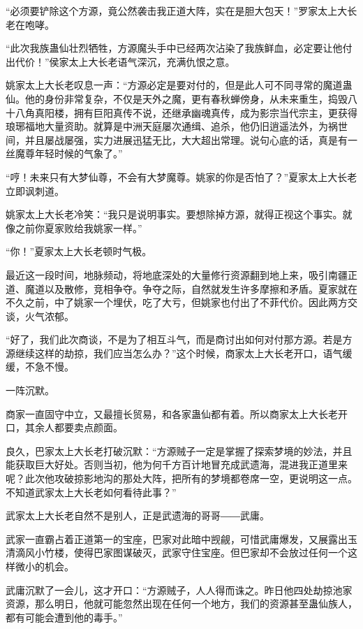 
\begin{this_body}

“必须要铲除这个方源，竟公然袭击我正道大阵，实在是胆大包天！”罗家太上大长老在咆哮。

“此次我族蛊仙壮烈牺牲，方源魔头手中已经两次沾染了我族鲜血，必定要让他付出代价！”侯家太上大长老语气深沉，充满仇恨之意。

姚家太上大长老叹息一声：“方源必定是要对付的，但是此人可不同寻常的魔道蛊仙。他的身份非常复杂，不仅是天外之魔，更有春秋蝉傍身，从未来重生，捣毁八十八角真阳楼，拥有巨阳真传不说，还继承幽魂真传，成为影宗当代宗主，更获得琅琊福地大量资助。就算是中洲天庭屡次通缉、追杀，他仍旧逍遥法外，为祸世间，并且屡战屡强，实力进展迅猛无比，大大超出常理。说句心底的话，真是有一丝魔尊年轻时候的气象了。”

“哼！未来只有大梦仙尊，不会有大梦魔尊。姚家的你是否怕了？”夏家太上大长老立即讽刺道。

姚家太上大长老冷笑：“我只是说明事实。要想除掉方源，就得正视这个事实。就像之前你夏家败给我姚家一样。”

“你！”夏家太上大长老顿时气极。

最近这一段时间，地脉频动，将地底深处的大量修行资源翻到地上来，吸引南疆正道、魔道以及散修，竞相争夺。争夺之际，自然就发生许多摩擦和矛盾。夏家就在不久之前，中了姚家一个埋伏，吃了大亏，但姚家也付出了不菲代价。因此两方交谈，火气浓郁。

“好了，我们此次商谈，不是为了相互斗气，而是商讨出如何对付那方源。若是方源继续这样的劫掠，我们应当怎么办？”这个时候，商家太上大长老开口，语气缓缓，不急不慢。

一阵沉默。

商家一直固守中立，又最擅长贸易，和各家蛊仙都有着。所以商家太上大长老开口，其余人都要卖点颜面。

良久，巴家太上大长老打破沉默：“方源贼子一定是掌握了探索梦境的妙法，并且能获取巨大好处。否则当初，他为何千方百计地冒充成武遗海，混进我正道里来呢？此次他攻破掠影地沟的那处大阵，把所有的梦境都卷席一空，更说明这一点。不知道武家太上大长老如何看待此事？”

武家太上大长老自然不是别人，正是武遗海的哥哥――武庸。

武家一直霸占着正道第一的宝座，巴家对此暗中觊觎，可惜武庸爆发，又展露出玉清滴风小竹楼，使得巴家图谋破灭，武家守住宝座。但巴家却不会放过任何一个这样微小的机会。

武庸沉默了一会儿，这才开口：“方源贼子，人人得而诛之。昨日他四处劫掠池家资源，那么明日，他就可能忽然出现在任何一个地方，我们的资源甚至蛊仙族人，都有可能会遭到他的毒手。”


\end{this_body}
